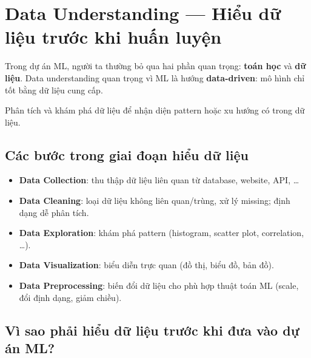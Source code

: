 \section{Data Understanding --- Hiểu dữ liệu trước khi huấn luyện}

\begin{dongco}[title={Hai phần thường bị bỏ qua: toán và dữ liệu}]
Trong dự án ML, người ta thường bỏ qua hai phần quan trọng: \textbf{toán học} và \textbf{dữ liệu}.
Data understanding quan trọng vì ML là hướng \textbf{data-driven}: mô hình chỉ tốt bằng dữ liệu cung cấp.
\end{dongco}

\begin{dinhnghia}[title={Data understanding}]
Phân tích và khám phá dữ liệu để nhận diện pattern hoặc xu hướng có trong dữ liệu.
\end{dinhnghia}

\begin{vidu}[title={Hình minh hoạ hiểu dữ liệu}]
\end{vidu}

\subsection{Các bước trong giai đoạn hiểu dữ liệu}

\begin{phuongphap}[title={Các bước trong giai đoạn hiểu dữ liệu}]
\begin{itemize}
  \item \textbf{Data Collection}: thu thập dữ liệu liên quan từ database, website, API, \ldots
  \item \textbf{Data Cleaning}: loại dữ liệu không liên quan/trùng, xử lý missing; định dạng dễ phân tích.
  \item \textbf{Data Exploration}: khám phá pattern (histogram, scatter plot, correlation, \ldots).
  \item \textbf{Data Visualization}: biểu diễn trực quan (đồ thị, biểu đồ, bản đồ).
  \item \textbf{Data Preprocessing}: biến đổi dữ liệu cho phù hợp thuật toán ML (scale, đổi định dạng, giảm chiều).
\end{itemize}
\end{phuongphap}

\subsection{Vì sao phải hiểu dữ liệu trước khi đưa vào dự án ML?}

